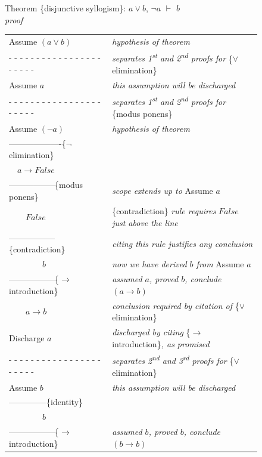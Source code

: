 {{\begin{figure}
Theorem \{disjunctive syllogism\}: $a \vee b$, $\neg a$ $\vdash$ $b$ \\
\emph{proof}
\begin{center}
\begin{spacing}{0.9}
\begin{tabular}{ll}
Assume $(a \vee b)$          &\emph{hypothesis of theorem}\\
 - - - - - - - - - - - - - - - - - - - - - -&\emph{separates 1\textsuperscript{st} and 2\textsuperscript{nd} proofs for} \{$\vee$ elimination\}\\
Assume $a$          & \emph{this assumption will be discharged}\\
 - - - - - - - - - - - - - - - - - - - - - -& \emph{separates 1\textsuperscript{st} and 2\textsuperscript{nd} proofs for} \{modus ponens\} \\
Assume $(\neg a)$        & \emph{hypothesis of theorem}\\
-------------------\{$\neg$ elimination\} \\
~~$a \rightarrow False$ &\\
-----------------\{modus ponens\} &\emph{scope extends up to} Assume $a$\\
~~~~$False$            &\{contradiction\} \emph{rule requires} $False$ \emph{just above the line}\\
-----------------\{contradiction\} &\emph{citing this rule justifies any conclusion}\\
~~~~~~~~$b$              &\emph{now we have derived $b$ from} Assume $a$\\
-----------------\{$\rightarrow$ introduction\} & \emph{assumed $a$, proved $b$, conclude $(a \rightarrow b)$}\\
~~~~$a \rightarrow b$ &\emph{conclusion required by citation of} \{$\vee$ elimination\} \\
Discharge $a$    &\emph{discharged by citing} \{$\rightarrow$ introduction\}\emph{, as promised}\\
 - - - - - - - - - - - - - - - - - - - - - -&\emph{separates 2\textsuperscript{nd} and 3\textsuperscript{rd} proofs for} \{$\vee$ elimination\}\\
Assume $b$          &\emph{this assumption will be discharged}\\
--------------\{identity\} &\\
~~~~~~~~$b$          &\\
-----------------\{$\rightarrow$ introduction\} &\emph{assumed $b$, proved $b$, conclude $(b \rightarrow b)$}\\

\end{tabular}
\end{spacing}
\end{center}
\end{figure}}}
